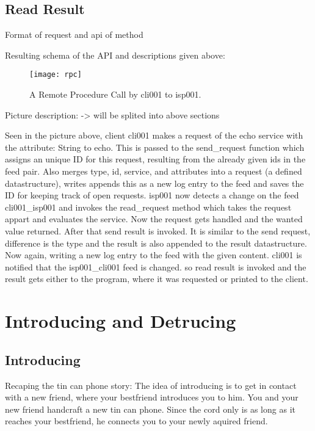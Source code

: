 \subsection{Read Result}
Format of request and api of method

Resulting schema of the API and descriptions given above:

\begin{figure}
    \centering
    \texttt{[image: rpc]}
    \caption{A Remote Procedure Call by cli001 to isp001.}
    \label{fig:contract_cli_isp}
\end{figure}


Picture description: -> will be splited into above sections

Seen in the picture above, client cli001 makes a request of the echo service with the attribute: String to echo. This is passed to the send\_request function which assigns an unique ID for this request, resulting from the already given ids in the feed pair. Also merges type, id, service, and attributes into a request (a defined datastructure), writes appends this as a new log entry to the feed and saves the ID for keeping track of open requests. isp001 now detects a change on the feed cli001\_isp001 and invokes the read\_request method which takes the request appart and evaluates the service. Now the request gets handled and the wanted value returned. After that send result is invoked. It is similar to the send request, difference is the type and the result is also appended to the result datastructure. Now again, writing a new log entry to the feed with the given content. cli001 is notified that the isp001\_cli001 feed is changed. so read result is invoked and the result gets either to the program, where it was requested or printed to the client.

\section{Introducing and Detrucing}
\subsection{Introducing}
Recaping the tin can phone story: The idea of introducing is to get in contact with a new friend, where your bestfriend introduces you to him. You and your new friend handcraft a new tin can phone. Since the cord only is as long as it reaches your bestfriend, he connects you to your newly aquired friend. \\

